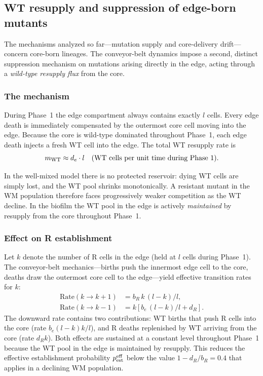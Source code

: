 \documentclass[12pt]{article}
\newcommand{\bEdge}{b_e}
\newcommand{\dEdge}{d_e}
\begin{document}
\subsection{WT resupply and suppression of edge-born mutants}
\label{sec:resupply}

The mechanisms analyzed so far---mutation supply and core-delivery
drift---concern core-born lineages. The conveyor-belt dynamics impose a
second, distinct suppression mechanism on mutations arising directly in
the edge, acting through a \emph{wild-type resupply flux} from the core.

\subsubsection*{The mechanism}

During Phase~1 the edge compartment always contains exactly $l$ cells.
Every edge death is immediately compensated by the outermost core cell
moving into the edge. Because the core is wild-type dominated throughout
Phase~1, each edge death injects a fresh WT cell into the edge. The
total WT resupply rate is
\begin{equation}
    m_{\rm WT} \approx \dEdge \cdot l
    \quad \text{(WT cells per unit time during Phase~1)}.
    \label{eq:wt_resupply}
\end{equation}

In the well-mixed model there is no protected reservoir: dying WT cells
are simply lost, and the WT pool shrinks monotonically. A resistant
mutant in the WM population therefore faces progressively weaker
competition as the WT decline. In the biofilm the WT pool in the edge
is actively \emph{maintained} by resupply from the core throughout
Phase~1.

\subsubsection*{Effect on R establishment}

Let $k$ denote the number of R cells in the edge (held at $l$ cells
during Phase~1). The conveyor-belt mechanics---births push the innermost
edge cell to the core, deaths draw the outermost core cell to the
edge---yield effective transition rates for $k$:
\begin{align}
    \text{Rate}(k \to k+1) &= b_R\, k\, (l-k)/l,
        \label{eq:up_rate} \\
    \text{Rate}(k \to k-1) &= k\left[\bEdge\,(l-k)/l + d_R\right].
        \label{eq:down_rate}
\end{align}
The downward rate contains two contributions: WT births that push R
cells into the core (rate $\bEdge(l-k)k/l$), and R deaths replenished
by WT arriving from the core (rate $d_R k$). Both effects are sustained
at a constant level throughout Phase~1 because the WT pool in the edge
is maintained by resupply. This reduces the effective establishment
probability $p_{\rm est}^{\rm eff}$ below the value
$1 - d_R/b_R = 0.4$ that applies in a declining WM population.
\end{document}
